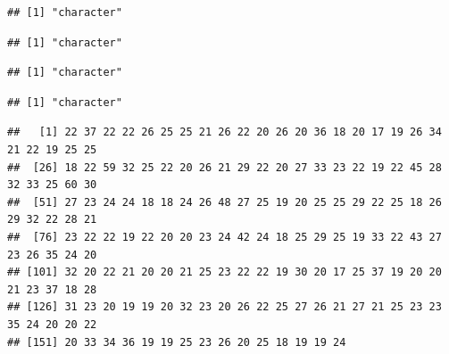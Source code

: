 \documentclass[
]{article}
\newenvironment{Shaded}{\begin{snugshade}}{\end{snugshade}}
\newcommand{\CommentTok}[1]{\textcolor[rgb]{0.56,0.35,0.01}{\textit{#1}}}
\newcommand{\FunctionTok}[1]{\textcolor[rgb]{0.00,0.00,0.00}{#1}}
\newcommand{\NormalTok}[1]{#1}
\newcommand{\SpecialCharTok}[1]{\textcolor[rgb]{0.00,0.00,0.00}{#1}}
\begin{document}
\begin{verbatim}
## [1] "character"
\end{verbatim}

\begin{Shaded}
\end{Shaded}

\begin{verbatim}
## [1] "character"
\end{verbatim}

\begin{Shaded}
\end{Shaded}

\begin{verbatim}
## [1] "character"
\end{verbatim}

\begin{Shaded}
\end{Shaded}

\begin{verbatim}
## [1] "character"
\end{verbatim}

\begin{Shaded}
\end{Shaded}

\begin{verbatim}
##   [1] 22 37 22 22 26 25 25 21 26 22 20 26 20 36 18 20 17 19 26 34 21 22 19 25 25
##  [26] 18 22 59 32 25 22 20 26 21 29 22 20 27 33 23 22 19 22 45 28 32 33 25 60 30
##  [51] 27 23 24 24 18 18 24 26 48 27 25 19 20 25 25 29 22 25 18 26 29 32 22 28 21
##  [76] 23 22 22 19 22 20 20 23 24 42 24 18 25 29 25 19 33 22 43 27 23 26 35 24 20
## [101] 32 20 22 21 20 20 21 25 23 22 22 19 30 20 17 25 37 19 20 20 21 23 37 18 28
## [126] 31 23 20 19 19 20 32 23 20 26 22 25 27 26 21 27 21 25 23 23 35 24 20 20 22
## [151] 20 33 34 36 19 19 25 23 26 20 25 18 19 19 24
\end{verbatim}
\end{document}
